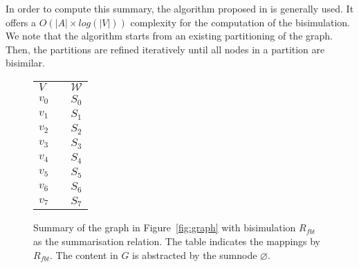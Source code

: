In order to compute this summary, the algorithm proposed in \cite{Paige:1987:TPR:37185.37186} is generally used. It offers a $O\left( \vert A \vert \times log\left( \vert V \vert \right) \right)$ complexity for the computation of the bisimulation. We note that the algorithm starts from an existing partitioning of the graph. Then, the partitions are refined iteratively until all nodes in a partition are bisimilar.%

\begin{figure}
	\centering
	\begin{minipage}{.75\textwidth}
		\resizebox{\textwidth}{!}{
			
		}
	\end{minipage}
	\quad
	\begin{minipage}[h]{.2\textwidth}
		\centering
		\caption*{$R_{fbt}\left(V, \mathcal{W}\right)$}
		\begin{tabular}{lc@{\hs}l}
			\toprule
			$V$ & \phantom{a} & $\mathcal{W}$ \\
			\cmidrule{1-1} \cmidrule{3-3}
			$v_0$ & \phantom{a} & $S_0$ \\
			$v_1$ & \phantom{a} & $S_1$ \\
			$v_2$ & \phantom{a} & $S_2$ \\
			$v_3$ & \phantom{a} & $S_3$ \\
			$v_4$ & \phantom{a} & $S_4$ \\
			$v_5$ & \phantom{a} & $S_5$ \\
			$v_6$ & \phantom{a} & $S_6$ \\
			$v_7$ & \phantom{a} & $S_7$ \\
			\bottomrule
		\end{tabular}
	\end{minipage}
	\caption{Summary of the graph in Figure~\ref{fig:graph} with bisimulation $R_{fbt}$ as the summarisation relation. The table indicates the mappings by $R_{fbt}$. The content in $G$ is abstracted by the sumnode $\varnothing$.}
	\label{fig:fbb-summary}
\end{figure}

